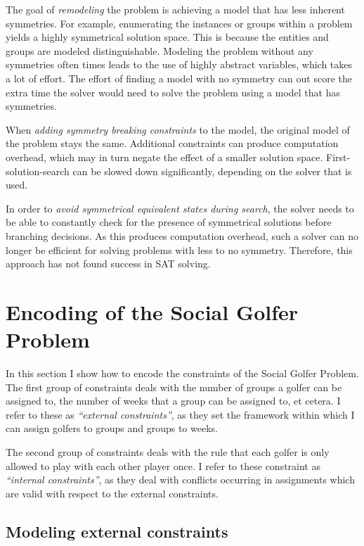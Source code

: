 \documentclass[a4paper]{scrartcl}
\begin{document}
The goal of \emph{remodeling} the problem is achieving a model that has less inherent symmetries. For example, enumerating the instances or groups within a problem yields a highly symmetrical solution space. This is because the entities and groups are modeled distinguishable. Modeling the problem without any symmetries often times leads to the use of highly abstract variables, which takes a lot of effort. The effort of finding a model with no symmetry can out score the extra time the solver would need to solve the problem using a model that has symmetries.

When \emph{adding symmetry breaking constraints} to the model, the original model of the problem stays the same. Additional constraints can produce computation overhead, which may in turn negate the effect of a smaller solution space. First-solution-search can be slowed down significantly, depending on the solver that is used\cite{Prestwich}.

In order to \emph{avoid symmetrical equivalent states during search}, the solver needs to be able to constantly check for the presence of symmetrical solutions before branching decisions. As this produces computation overhead, such a solver can no longer be efficient for solving problems with less to no symmetry. Therefore, this approach has not found success in SAT solving.

\section{Encoding of the Social Golfer Problem}

In this section I show how to encode the constraints of the Social Golfer Problem. The first group of constraints deals with the number of groups a golfer can be assigned to, the number of weeks that a group can be assigned to, et cetera. I refer to these as \emph{``external constraints''}, as they set the framework within which I can assign golfers to groups and groups to weeks.

The second group of constraints deals with the rule that each golfer is only allowed to play with each other player once. I refer to these constraint as \emph{``internal constraints''}, as they deal with conflicts occurring in assignments which are valid with respect to the external constraints.


\subsection{Modeling external constraints}
\end{document}
